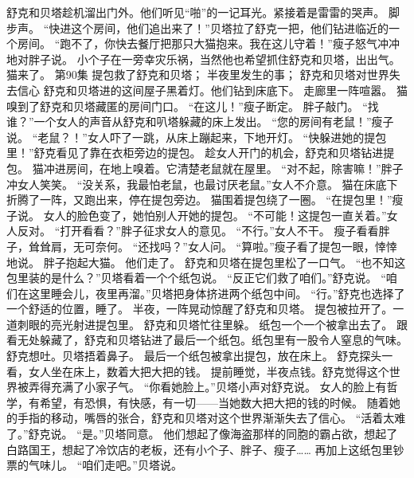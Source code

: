 \documentclass[a4paper,12pt,UTF8,twoside]{ctexbook}
\begin{document}
        舒克和贝塔趁机溜出门外。他们听见“啪”的一记耳光。紧接着是雷雷的哭声。 
        脚步声。 
        “快进这个房间，他们追出来了！”贝塔拉了舒克一把，他们钻进临近的一个房间。 
        “跑不了，你快去餐厅把那只大猫抱来。我在这儿守着！”瘦子怒气冲冲地对胖子说。 
        小个子在一旁幸灾乐祸，当然他也希望抓住舒克和贝塔，出出气。 
        猫来了。   第90集 
        提包救了舒克和贝塔； 
        半夜里发生的事； 
        舒克和贝塔对世界失去信心   
        舒克和贝塔进的这间屋子黑着灯。他们钻到床底下。 
        走廊里一阵喧嚣。 
        猫嗅到了舒克和贝塔藏匿的房间门口。 
        “在这儿！”瘦子断定。 
        胖子敲门。 
        “找谁？”一个女人的声音从舒克和叭塔躲藏的床上发出。 
        “您的房间有老鼠！”瘦子说。 
        “老鼠？！”女人吓了一跳，从床上蹦起来，下地开灯。 
        “快躲进她的提包里！”舒克看见了靠在衣柜旁边的提包。 
        趁女人开门的机会，舒克和贝塔钻进提包。 
        猫冲进房间，在地上嗅着。它清楚老鼠就在屋里。 
        “对不起，除害嘛！”胖子冲女人笑笑。 
        “没关系，我最怕老鼠，也最讨厌老鼠。”女人不介意。 
        猫在床底下折腾了一阵，又跑出来，停在提包旁边。 
        猫围着提包绕了一圈。 
        “在提包里！”瘦子说。 
        女人的脸色变了，她怕别人开她的提包。 
        “不可能！这提包一直关着。”女人反对。 
        “打开看看？”胖子征求女人的意见。 
        “不行。”女人不干。 
        瘦子看看胖子，耸耸肩，无可奈何。 
        “还找吗？”女人问。 
        “算啦。”瘦子看了提包一眼，悻悻地说。 
        胖子抱起大猫。 
        他们走了。 
        舒克和贝塔在提包里松了一口气。 
        “也不知这包里装的是什么？”贝塔看着一个个纸包说。 
        “反正它们救了咱们。”舒克说。 
        “咱们在这里睡会儿，夜里再溜。”贝塔把身体挤进两个纸包中间。 
        “行。”舒克也选择了一个舒适的位置，睡了。 
        半夜，一阵晃动惊醒了舒克和贝塔。 
        提包被拉开了。一道刺眼的亮光射进提包里。 
        舒克和贝塔忙往里躲。 
        纸包一个一个被拿出去了。 
        跟看无处躲藏了，舒克和贝塔钻进了最后一个纸包。纸包里有一股令人窒息的气味。舒克想吐。贝塔捂着鼻子。 
        最后一个纸包被拿出提包，放在床上。 
        舒克探头一看，女人坐在床上，数着大把大把的钱。 
        提前睡觉，半夜点钱。舒克觉得这个世界被弄得充满了小家子气。 
        “你看她脸上。”贝塔小声对舒克说。 
        女人的脸上有哲学，有希望，有恐惧，有快感，有一切——当她数大把大把的钱的时候。 
        随着她的手指的移动，嘴唇的张合，舒克和贝塔对这个世界渐渐失去了信心。 
        “活着太难了。”舒克说。 
        “是。”贝塔同意。 
        他们想起了像海盗那样的同胞的霸占欲，想起了白路国王，想起了冷饮店的老板，还有小个子、胖子、瘦子…… 
        再加上这纸包里钞票的气味儿。 
        “咱们走吧。”贝塔说。 
\end{document}
